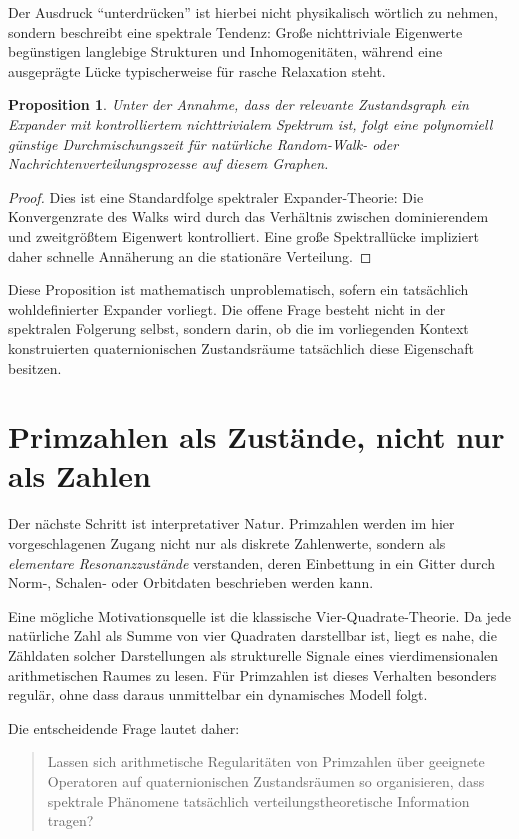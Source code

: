 \documentclass[12pt,a4paper]{article}
\newtheorem{proposition}[theorem]{Proposition}
\begin{document}
	Der Ausdruck ``unterdrücken'' ist hierbei nicht physikalisch wörtlich zu nehmen, sondern beschreibt eine spektrale Tendenz: Große nichttriviale Eigenwerte begünstigen langlebige Strukturen und Inhomogenitäten, während eine ausgeprägte Lücke typischerweise für rasche Relaxation steht.
	
	\begin{proposition}
		Unter der Annahme, dass der relevante Zustandsgraph ein Expander mit kontrolliertem nichttrivialem Spektrum ist, folgt eine polynomiell günstige Durchmischungszeit für natürliche Random-Walk- oder Nachrichtenverteilungsprozesse auf diesem Graphen.
	\end{proposition}
	
	\begin{proof}
		Dies ist eine Standardfolge spektraler Expander-Theorie: Die Konvergenzrate des Walks wird durch das Verhältnis zwischen dominierendem und zweitgrößtem Eigenwert kontrolliert. Eine große Spektrallücke impliziert daher schnelle Annäherung an die stationäre Verteilung.
	\end{proof}
	
	Diese Proposition ist mathematisch unproblematisch, sofern ein tatsächlich wohldefinierter Expander vorliegt. Die offene Frage besteht nicht in der spektralen Folgerung selbst, sondern darin, ob die im vorliegenden Kontext konstruierten quaternionischen Zustandsräume tatsächlich diese Eigenschaft besitzen.
	
	\section{Primzahlen als Zustände, nicht nur als Zahlen}
	
	Der nächste Schritt ist interpretativer Natur. Primzahlen werden im hier vorgeschlagenen Zugang nicht nur als diskrete Zahlenwerte, sondern als \emph{elementare Resonanzzustände} verstanden, deren Einbettung in ein Gitter durch Norm-, Schalen- oder Orbitdaten beschrieben werden kann.
	
	Eine mögliche Motivationsquelle ist die klassische Vier-Quadrate-Theorie. Da jede natürliche Zahl als Summe von vier Quadraten darstellbar ist, liegt es nahe, die Zähldaten solcher Darstellungen als strukturelle Signale eines vierdimensionalen arithmetischen Raumes zu lesen. Für Primzahlen ist dieses Verhalten besonders regulär, ohne dass daraus unmittelbar ein dynamisches Modell folgt.
	
	Die entscheidende Frage lautet daher:
	\begin{quote}
		Lassen sich arithmetische Regularitäten von Primzahlen über geeignete Operatoren auf quaternionischen Zustandsräumen so organisieren, dass spektrale Phänomene tatsächlich verteilungstheoretische Information tragen?
	\end{quote}
	
\end{document}
